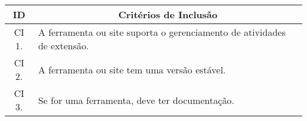 \begin{table}[!htb]
  \centering
  \footnotesize
  \begin{tabular}{c|p{8cm}}
    \bottomrule
    \rowcolor[rgb]{0.753,0.753,0.753} \textbf{ID} & \multicolumn{1}{c}{\textbf{Critérios de Inclusão}}                     \\
    \hline
    \rowcolor[HTML]{DEDEDE}
    CI 1.                                         & A ferramenta ou site suporta o gerenciamento de atividades de extensão. \\
    CI 2.                                         & A ferramenta ou site tem uma versão estável.                           \\
    \rowcolor[HTML]{DEDEDE}
    CI 3.                                         & Se for uma ferramenta, deve ter documentação.                        \\
    \toprule
  \end{tabular}
\end{table}